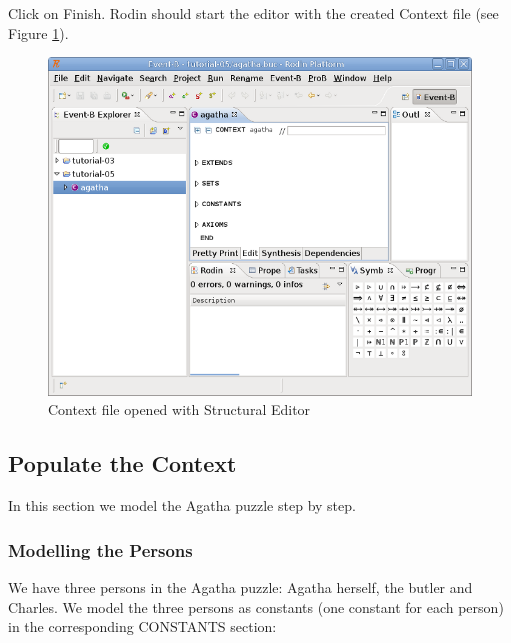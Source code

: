 Click on \textsf{Finish}. Rodin should start the editor with the created Context file (see Figure \ref{fig_tut_05_context_file}).

\begin{figure}[!h]
\begin{center}
	\includegraphics{img/tutorial/tut_05_agatha2.png}
	\caption{Context file opened with Structural Editor}
	\label{fig_tut_05_context_file}
\end{center}
\end{figure}

\subsection{Populate the Context}

In this section we model the Agatha puzzle step by step.

\subsubsection{Modelling the Persons}
\label{tut_modelling_the_persons}

We have three persons in the Agatha puzzle: Agatha herself, the butler and Charles. We model the three persons as constants (one constant for each person) in the corresponding \textsf{CONSTANTS} section:


